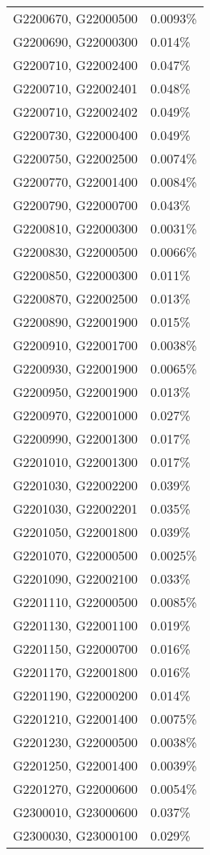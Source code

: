 \begin{longtable}[]{@{}ll@{}}
G2200670, G22000500 & 0.0093\% \\
G2200690, G22000300 & 0.014\% \\
G2200710, G22002400 & 0.047\% \\
G2200710, G22002401 & 0.048\% \\
G2200710, G22002402 & 0.049\% \\
G2200730, G22000400 & 0.049\% \\
G2200750, G22002500 & 0.0074\% \\
G2200770, G22001400 & 0.0084\% \\
G2200790, G22000700 & 0.043\% \\
G2200810, G22000300 & 0.0031\% \\
G2200830, G22000500 & 0.0066\% \\
G2200850, G22000300 & 0.011\% \\
G2200870, G22002500 & 0.013\% \\
G2200890, G22001900 & 0.015\% \\
G2200910, G22001700 & 0.0038\% \\
G2200930, G22001900 & 0.0065\% \\
G2200950, G22001900 & 0.013\% \\
G2200970, G22001000 & 0.027\% \\
G2200990, G22001300 & 0.017\% \\
G2201010, G22001300 & 0.017\% \\
G2201030, G22002200 & 0.039\% \\
G2201030, G22002201 & 0.035\% \\
G2201050, G22001800 & 0.039\% \\
G2201070, G22000500 & 0.0025\% \\
G2201090, G22002100 & 0.033\% \\
G2201110, G22000500 & 0.0085\% \\
G2201130, G22001100 & 0.019\% \\
G2201150, G22000700 & 0.016\% \\
G2201170, G22001800 & 0.016\% \\
G2201190, G22000200 & 0.014\% \\
G2201210, G22001400 & 0.0075\% \\
G2201230, G22000500 & 0.0038\% \\
G2201250, G22001400 & 0.0039\% \\
G2201270, G22000600 & 0.0054\% \\
G2300010, G23000600 & 0.037\% \\
G2300030, G23000100 & 0.029\% \\

\end{longtable}
